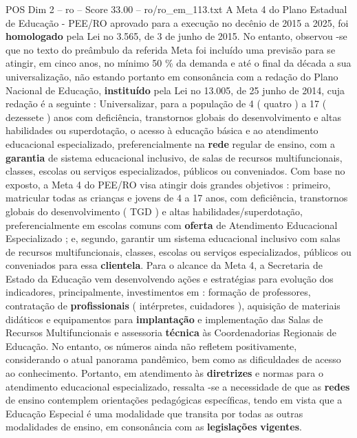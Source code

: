 \begin{textsample}{POS Dim 2 – ro – Score 33.00 – ro/ro\_em\_113.txt}
A Meta 4 do Plano Estadual de Educação - PEE/RO aprovado para a execução no decênio de 2015 a 2025, foi \textbf{homologado} pela Lei no 3.565, de 3 de junho de 2015.
No entanto, observou -se que no texto do preâmbulo da referida Meta foi incluído uma previsão para se atingir, em cinco anos, no mínimo 50 \% da demanda e até o final da década a sua universalização, não estando portanto em consonância com a redação do Plano Nacional de Educação, \textbf{instituído} pela Lei no 13.005, de 25 junho de 2014, cuja redação é a seguinte : Universalizar, para a população de 4 ( quatro ) a 17 ( dezessete ) anos com deficiência, transtornos globais do desenvolvimento e altas habilidades ou superdotação, o acesso à educação básica e ao atendimento educacional especializado, preferencialmente na \textbf{rede} regular de ensino, com a \textbf{garantia} de sistema educacional inclusivo, de salas de recursos multifuncionais, classes, escolas ou serviços especializados, públicos ou conveniados.
Com base no exposto, a Meta 4 do PEE/RO visa atingir dois grandes objetivos : primeiro, matricular todas as crianças e jovens de 4 a 17 anos, com deficiência, transtornos globais do desenvolvimento ( TGD ) e altas habilidades/superdotação, preferencialmente em escolas comuns com \textbf{oferta} de Atendimento Educacional Especializado ; e, segundo, garantir um sistema educacional inclusivo com salas de recursos multifuncionais, classes, escolas ou serviços especializados, públicos ou conveniados para essa \textbf{clientela}.
Para o alcance da Meta 4, a Secretaria de Estado da Educação vem desenvolvendo ações e estratégias para evolução dos indicadores, principalmente, investimentos em : formação de professores, contratação de \textbf{profissionais} ( intérpretes, cuidadores ), aquisição de materiais didáticos e equipamentos para \textbf{implantação} e implementação das Salas de Recursos Multifuncionais e assessoria \textbf{técnica} às Coordenadorias Regionais de Educação.
No entanto, os números ainda não refletem positivamente, considerando o atual panorama pandêmico, bem como as dificuldades de acesso ao conhecimento.
Portanto, em atendimento às \textbf{diretrizes} e normas para o atendimento educacional especializado, ressalta -se a necessidade de que as \textbf{redes} de ensino contemplem orientações pedagógicas específicas, tendo em vista que a Educação Especial é uma modalidade que transita por todas as outras modalidades de ensino, em consonância com as \textbf{legislações} \textbf{vigentes}.

\end{textsample}

